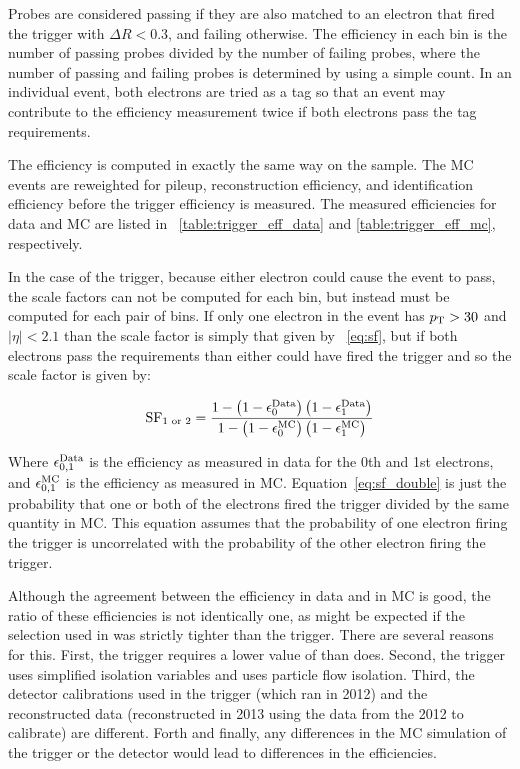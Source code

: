 Probes are considered passing if they are also matched to an electron that
fired the trigger with $\Delta R < 0.3$, and failing otherwise. The efficiency
in each bin is the number of passing probes divided by the number of failing
probes, where the number of passing and failing probes is determined by using a
simple count. In an individual event, both electrons are tried as a tag so that
an event may contribute to the efficiency measurement twice if both electrons
pass the tag requirements.

The efficiency is computed in exactly the same way on the \MADGRAPH sample. The
MC events are reweighted for pileup, reconstruction efficiency, and
identification efficiency before the trigger efficiency is measured. The
measured efficiencies for data and MC are listed in
\TABS~\ref{table:trigger_eff_data} and \ref{table:trigger_eff_mc}, respectively.

In the case of the trigger, because either electron could cause the event to
pass, the scale factors can not be computed for each bin, but instead must be computed
for each pair of bins. If only one electron in the event has $p_{\mathrm{T}} > 30$ and
$|\eta| < 2.1$ than the scale factor is simply that given by \EQ~\ref{eq:sf}, but if both
electrons pass the requirements than either could have fired the trigger and so
the scale factor is given by:

\begin{equation} \label{eq:sf_double}
    \text{SF}_{1 \text{ or } 2}
    =
    \frac{
        1 - \left( 1 - \epsilon^{\text{Data}}_{0} \right) \left( 1 - \epsilon^{\text{Data}}_{1} \right)
    } {
        1 - \left( 1 - \epsilon^{\text{MC}}_{0} \right) \left( 1 - \epsilon^{\text{MC}}_{1} \right)
    }
\end{equation}

Where $\epsilon^{\text{Data}}_{0,1}$ is the efficiency as measured in data for the 0th and
1st electrons, and $\epsilon^{\text{MC}}_{0,1}$ is the efficiency as measured in MC.
Equation~\ref{eq:sf_double} is just the probability that one or both of the
electrons fired the trigger divided by the same quantity in MC. This equation
assumes that the probability of one electron firing the trigger is uncorrelated
with the probability of the other electron firing the trigger.





Although the agreement between the efficiency in data and in MC is good, the
ratio of these efficiencies is not identically one, as might be expected if the
selection used in \TnP was strictly tighter than the trigger. There are several
reasons for this. First, the trigger requires a lower value of \HOverE than
\EGTIGHT does. Second, the trigger uses simplified isolation variables and
\EGTIGHT uses particle flow isolation. Third, the detector calibrations used in
the trigger (which ran in 2012) and the reconstructed data (reconstructed in
2013 using the data from the 2012 to calibrate) are different. Forth and
finally, any differences in the MC simulation of the trigger or the detector
would lead to differences in the efficiencies. 

